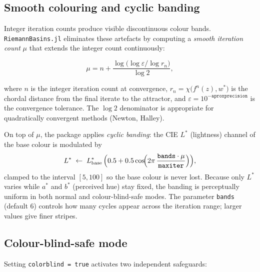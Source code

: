 \documentclass[11pt,a4paper]{article}
\theoremstyle{definition}
\newcommand{\pkg}[1]{\texttt{#1}}
\newcommand{\opt}[1]{\texttt{#1}}
\begin{document}
\subsection{Smooth colouring and cyclic banding}

Integer iteration counts produce visible discontinuous colour bands.
\pkg{RiemannBasins.jl} eliminates these artefacts by computing a \emph{smooth
iteration count} $\mu$ that extends the integer count continuously:

\begin{equation}
  \mu = n + \frac{\log\!\bigl(\log\varepsilon / \log r_n\bigr)}{\log 2},
  \label{eq:smooth}
\end{equation}

where $n$ is the integer iteration count at convergence, $r_n =
\chi\bigl(f^n(z),w^*\bigr)$ is the chordal distance from the final iterate
to the attractor, and $\varepsilon = 10^{-\mathtt{aproxprecision}}$ is the
convergence tolerance.  The $\log 2$ denominator is appropriate for
quadratically convergent methods (Newton, Halley).

On top of $\mu$, the package applies \emph{cyclic banding}: the CIE
$L^*$ (lightness) channel of the base colour is modulated by
\begin{equation}
  L^* \;\leftarrow\; L^*_{\mathrm{base}}\,\Bigl(0.5 + 0.5\cos\!\Bigl(2\pi\,
      \frac{\mathtt{bands}\cdot\mu}{\mathtt{maxiter}}\Bigr)\Bigr),
  \label{eq:banding}
\end{equation}
clamped to the interval $[5, 100]$ so the base colour is never lost.
Because only $L^*$ varies while $a^*$ and $b^*$ (perceived hue) stay fixed,
the banding is perceptually uniform in both normal and colour-blind-safe modes.
The parameter \opt{bands} (default $6$) controls how many cycles appear
across the iteration range; larger values give finer stripes.

\subsection{Colour-blind-safe mode}

Setting \opt{colorblind = true} activates two independent safeguards:
\end{document}
